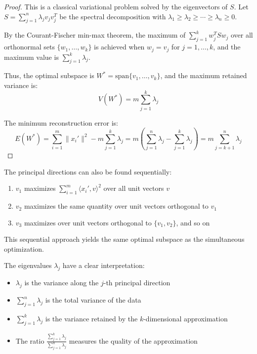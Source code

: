 \begin{notechapter}
\begin{proof}
This is a classical variational problem solved by the eigenvectors of $S$. Let $S = \sum_{j=1}^n \lambda_j v_j v_j^T$ be the spectral decomposition with $\lambda_1 \geq \lambda_2 \geq \cdots \geq \lambda_n \geq 0$.

By the Courant-Fischer min-max theorem, the maximum of $\sum_{j=1}^k w_j^T S w_j$ over all orthonormal sets $\{w_1, \dots, w_k\}$ is achieved when $w_j = v_j$ for $j = 1, \dots, k$, and the maximum value is $\sum_{j=1}^k \lambda_j$.

Thus, the optimal subspace is $W^* = \text{span}\{v_1, \dots, v_k\}$, and the maximum retained variance is:
\[
V(W^*) = m \sum_{j=1}^k \lambda_j
\]

The minimum reconstruction error is:
\[
E(W^*) = \sum_{i=1}^m \|x_i'\|^2 - m\sum_{j=1}^k \lambda_j = m\left(\sum_{j=1}^n \lambda_j - \sum_{j=1}^k \lambda_j\right) = m\sum_{j=k+1}^n \lambda_j
\]
\end{proof}

\begin{remark}
The principal directions can also be found sequentially:
\begin{enumerate}
    \item $v_1$ maximizes $\sum_{i=1}^m \langle x_i', v \rangle^2$ over all unit vectors $v$
    \item $v_2$ maximizes the same quantity over unit vectors orthogonal to $v_1$
    \item $v_3$ maximizes over unit vectors orthogonal to $\{v_1, v_2\}$, and so on
\end{enumerate}
This sequential approach yields the same optimal subspace as the simultaneous optimization.
\end{remark}

\begin{remark}
The eigenvalues $\lambda_j$ have a clear interpretation:
\begin{itemize}
    \item $\lambda_j$ is the variance along the $j$-th principal direction
    \item $\sum_{j=1}^n \lambda_j$ is the total variance of the data
    \item $\sum_{j=1}^k \lambda_j$ is the variance retained by the $k$-dimensional approximation
    \item The ratio $\frac{\sum_{j=1}^k \lambda_j}{\sum_{j=1}^n \lambda_j}$ measures the quality of the approximation
\end{itemize}
\end{remark}


\end{notechapter}
